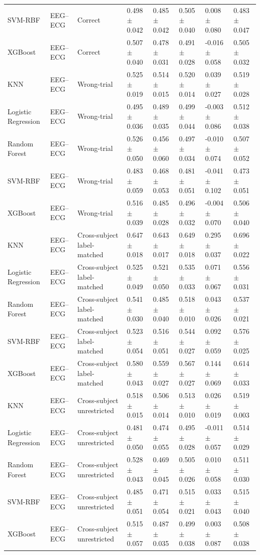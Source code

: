 \begin{table}[!t]
\begin{tabular}{llllllll}
SVM-RBF & EEG--ECG & Correct & 0.498 $\pm$ 0.042 & 0.485 $\pm$ 0.042 & 0.505 $\pm$ 0.040 & 0.008 $\pm$ 0.080 & 0.483 $\pm$ 0.047 \\
XGBoost & EEG--ECG & Correct & 0.507 $\pm$ 0.040 & 0.478 $\pm$ 0.031 & 0.491 $\pm$ 0.028 & -0.016 $\pm$ 0.058 & 0.505 $\pm$ 0.032 \\
KNN & EEG--ECG & Wrong-trial & 0.525 $\pm$ 0.019 & 0.514 $\pm$ 0.015 & 0.520 $\pm$ 0.014 & 0.039 $\pm$ 0.027 & 0.519 $\pm$ 0.028 \\
Logistic Regression & EEG--ECG & Wrong-trial & 0.495 $\pm$ 0.036 & 0.489 $\pm$ 0.035 & 0.499 $\pm$ 0.044 & -0.003 $\pm$ 0.086 & 0.512 $\pm$ 0.038 \\
Random Forest & EEG--ECG & Wrong-trial & 0.526 $\pm$ 0.050 & 0.456 $\pm$ 0.060 & 0.497 $\pm$ 0.034 & -0.010 $\pm$ 0.074 & 0.507 $\pm$ 0.052 \\
SVM-RBF & EEG--ECG & Wrong-trial & 0.483 $\pm$ 0.059 & 0.468 $\pm$ 0.053 & 0.481 $\pm$ 0.051 & -0.041 $\pm$ 0.102 & 0.473 $\pm$ 0.051 \\
XGBoost & EEG--ECG & Wrong-trial & 0.516 $\pm$ 0.039 & 0.485 $\pm$ 0.028 & 0.496 $\pm$ 0.032 & -0.004 $\pm$ 0.070 & 0.506 $\pm$ 0.040 \\
KNN & EEG--ECG & Cross-subject label-matched & 0.647 $\pm$ 0.018 & 0.643 $\pm$ 0.017 & 0.649 $\pm$ 0.018 & 0.295 $\pm$ 0.037 & 0.696 $\pm$ 0.022 \\
Logistic Regression & EEG--ECG & Cross-subject label-matched & 0.525 $\pm$ 0.049 & 0.521 $\pm$ 0.050 & 0.535 $\pm$ 0.033 & 0.071 $\pm$ 0.067 & 0.556 $\pm$ 0.031 \\
Random Forest & EEG--ECG & Cross-subject label-matched & 0.541 $\pm$ 0.030 & 0.485 $\pm$ 0.040 & 0.518 $\pm$ 0.010 & 0.043 $\pm$ 0.026 & 0.537 $\pm$ 0.021 \\
SVM-RBF & EEG--ECG & Cross-subject label-matched & 0.523 $\pm$ 0.054 & 0.516 $\pm$ 0.051 & 0.544 $\pm$ 0.027 & 0.092 $\pm$ 0.059 & 0.576 $\pm$ 0.025 \\
XGBoost & EEG--ECG & Cross-subject label-matched & 0.580 $\pm$ 0.043 & 0.559 $\pm$ 0.027 & 0.567 $\pm$ 0.027 & 0.144 $\pm$ 0.069 & 0.614 $\pm$ 0.033 \\
KNN & EEG--ECG & Cross-subject unrestricted & 0.518 $\pm$ 0.015 & 0.506 $\pm$ 0.014 & 0.513 $\pm$ 0.010 & 0.026 $\pm$ 0.019 & 0.519 $\pm$ 0.003 \\
Logistic Regression & EEG--ECG & Cross-subject unrestricted & 0.481 $\pm$ 0.050 & 0.474 $\pm$ 0.055 & 0.495 $\pm$ 0.028 & -0.011 $\pm$ 0.057 & 0.514 $\pm$ 0.029 \\
Random Forest & EEG--ECG & Cross-subject unrestricted & 0.528 $\pm$ 0.043 & 0.469 $\pm$ 0.045 & 0.505 $\pm$ 0.026 & 0.010 $\pm$ 0.058 & 0.511 $\pm$ 0.030 \\
SVM-RBF & EEG--ECG & Cross-subject unrestricted & 0.485 $\pm$ 0.051 & 0.471 $\pm$ 0.054 & 0.515 $\pm$ 0.021 & 0.033 $\pm$ 0.043 & 0.515 $\pm$ 0.040 \\
XGBoost & EEG--ECG & Cross-subject unrestricted & 0.515 $\pm$ 0.057 & 0.487 $\pm$ 0.035 & 0.499 $\pm$ 0.038 & 0.003 $\pm$ 0.087 & 0.508 $\pm$ 0.038 \\
\bottomrule
\end{tabular}
\end{table}